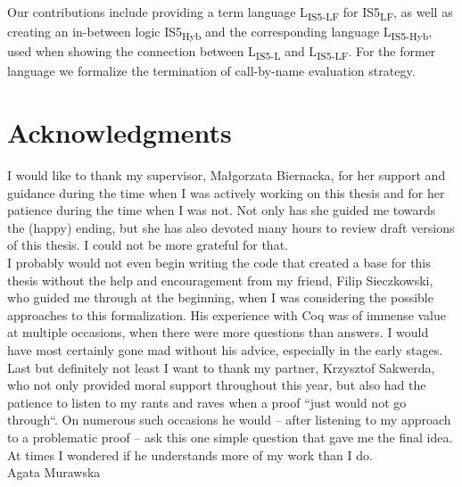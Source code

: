 \documentclass[a4paper,12pt]{report}
\newcommand{\logicLF}{IS5\textsubscript{LF}}
\newcommand{\logicHyb}{IS5\textsubscript{Hyb}}
\newcommand{\langL}{L\textsubscript{IS5-L}}
\newcommand{\langLF}{L\textsubscript{IS5-LF}}
\newcommand{\langHyb}{L\textsubscript{IS5-Hyb}}
\theoremstyle{introtheoremBstyle}
\theoremstyle{plain}
\begin{document}
Our contributions include providing a term language \langLF{} for \logicLF{}, as well as creating an in-between logic \logicHyb{} and the corresponding language \langHyb{}, used when showing the connection between \langL{} and \langLF{}. For the former language we formalize the termination of call-by-name evaluation strategy. 

\newpage
\mbox{}

\newpage
\chapter*{Acknowledgments}
I would like to thank my supervisor, Małgorzata Biernacka, for her support and guidance during the time when I was actively working on this thesis and for her patience during the time when I was not. Not only has she guided me towards the (happy) ending, but she has also devoted many hours to review draft versions of this thesis. I could not be more grateful for that.\\

I probably would not even begin writing the code that created a base for this thesis without the help and encouragement from my friend, Filip Sieczkowski, who guided me through at the beginning, when I was considering the possible approaches to this formalization. His experience with Coq was of immense value at multiple occasions, when there were more questions than answers. I would have most certainly gone mad without his advice, especially in the early stages.\\

Last but definitely not least I want to thank my partner, Krzysztof Sakwerda, who not only provided moral support throughout this year, but also had the patience to listen to my rants and raves when a proof ``just would not go through``. On numerous such occasions he would -- after listening to my approach to a problematic proof -- ask this one simple question that gave me the final idea.  At times I wondered if he understands more of my work than I do.\\[2cm]

Agata Murawska

\newpage
\mbox{}

\tableofcontents








\appendix




\end{document}
